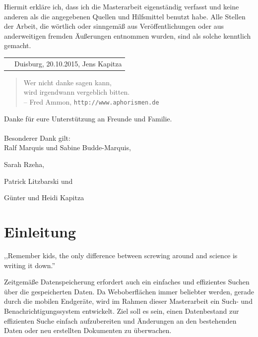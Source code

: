 \documentclass[oneside, ngerman, toc=bibliography,bibliography=totoc,listof=entryprefix, open=right,numbers=noenddot,fontsize=12pt]{scrbook}
\newcommand{\autor}{Jens Kapitza}
\newcommand{\ort}{Duisburg}
\newcommand{\einreichung}{20.10.2015}
\newcommand\chapmd[2]{\begin{mdframed}[%
		rightline=false,leftline=false,topline=false,bottomline=false,frametitlerule=false,
		userdefinedwidth=\textwidth,frametitlealignment=\flushright, %
		frametitlerulecolor=black,frametitle={\small #1}]
		\flushright{} \footnotesize{} #2
	\end{mdframed}}
\begin{document}
\vspace*{\fill}

\noindent Hiermit erkläre ich, dass ich die Masterarbeit eigenständig verfasst und keine anderen
als die angegebenen Quellen und Hilfsmittel benutzt habe.
Alle Stellen der Arbeit, die wörtlich oder sinngemäß aus \mbox{Veröffentlichungen} oder aus anderweitigen
fremden Äußerungen entnommen wurden, sind als solche kenntlich gemacht.

\vspace{30mm}


\begin{tabularx}{\linewidth}{Xr}\cline{2-2}
& \ort{}, \einreichung{}, \autor{}
\end{tabularx}


\cleardoublepage
\vspace*{3cm}
\begin{quote}\Large
\centering
    Wer nicht danke sagen kann,\\wird irgendwann vergeblich bitten.\\
    {\small -- Fred Ammon,  \verb|http://www.aphorismen.de| }
\end{quote}
\vspace*{3cm}
\noindent
Danke für eure Unterstützung an Freunde und Familie. \\ \bigskip \\
Besonderer Dank gilt: \\

Ralf Marquis und Sabine Budde-Marquis,

Sarah Rzeha,

Patrick Litzbarski und 

Günter und Heidi Kapitza

\pagebreak


\tableofcontents{}

\mainmatter{}


\chapter{Einleitung}
\label{chap:einleitung}
\chapmd{Facebookseite der MythBusters (26.09.2013)}{,,Remember kids, the only difference between screwing around and science is writing it down.''}

Zeitgemäße Datenspeicherung erfordert auch ein einfaches und effizientes Suchen über die gespeicherten Daten. Da Weboberflächen immer beliebter werden, gerade durch die mobilen Endgeräte, wird im Rahmen dieser Masterarbeit ein Such- und Benachrichtigungssystem entwickelt. Ziel soll es sein, einen Datenbestand zur effizienten Suche einfach aufzubereiten und Änderungen an den bestehenden Daten oder neu erstellten Dokumenten zu überwachen.
\end{document}
